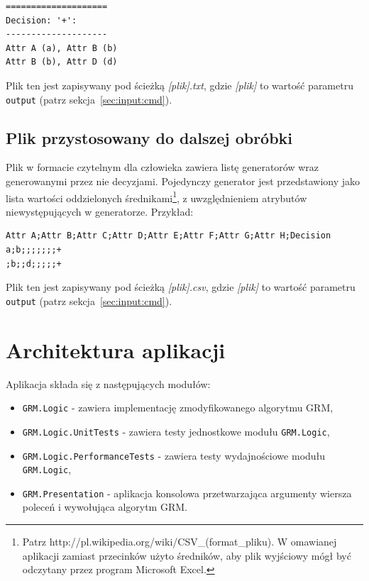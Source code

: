 \documentclass[a4paper,10pt]{article}
\begin{document}
\begin{verbatim}
====================
Decision: '+':
--------------------
Attr A (a), Attr B (b)
Attr B (b), Attr D (d)
\end{verbatim}

 Plik ten jest zapisywany pod ścieżką \emph{[plik].txt}, gdzie \emph{[plik]} to wartość parametru \verb+output+ (patrz sekcja~\ref{sec:input:cmd}).

 
 \subsection{Plik przystosowany do dalszej obróbki} \label{sec:output:csv}
 Plik w formacie czytelnym dla człowieka zawiera listę generatorów wraz generowanymi przez nie decyzjami.
 Pojedynczy generator jest przedstawiony jako lista wartości oddzielonych średnikami\footnote{Patrz http://pl.wikipedia.org/wiki/CSV\_(format\_pliku). W omawianej aplikacji zamiast przecinków użyto średników, aby plik wyjściowy mógł być odczytany przez program Microsoft Excel.}, z uwzględnieniem atrybutów niewystępujących w generatorze.
 Przykład:
 
\begin{verbatim}
Attr A;Attr B;Attr C;Attr D;Attr E;Attr F;Attr G;Attr H;Decision
a;b;;;;;;;+
;b;;d;;;;;+
\end{verbatim}
 
 Plik ten jest zapisywany pod ścieżką \emph{[plik].csv}, gdzie \emph{[plik]} to wartość parametru \verb+output+ (patrz sekcja~\ref{sec:input:cmd}).



\section{Architektura aplikacji} \label{sec:arch}
Aplikacja składa się z następujących modułów:

\begin{itemize}
 \item \verb+GRM.Logic+ - zawiera implementację zmodyfikowanego algorytmu GRM,
 \item \verb+GRM.Logic.UnitTests+ - zawiera testy jednostkowe modułu \verb+GRM.Logic+,
 \item \verb+GRM.Logic.PerformanceTests+ - zawiera testy wydajnościowe modułu \verb+GRM.Logic+, 
 \item \verb+GRM.Presentation+ - aplikacja konsolowa przetwarzająca argumenty wiersza poleceń i wywołująca algorytm GRM.
\end{itemize}
\end{document}
